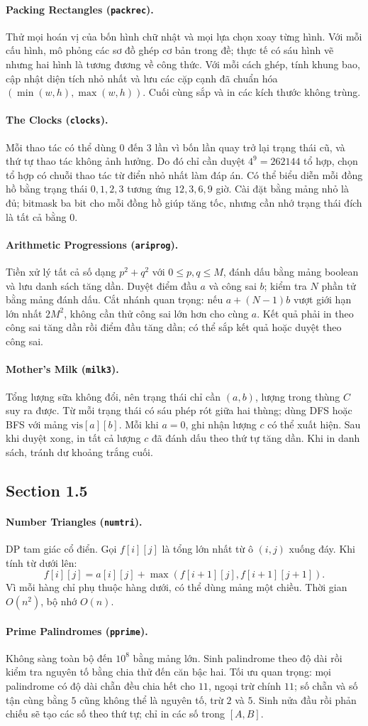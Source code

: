 \documentclass[11pt]{article}
\newcommand{\problem}[2]{\paragraph{#1 (\texttt{#2}).}}
\newcommand{\bigO}[1]{\ensuremath{O(#1)}}
\begin{document}
\problem{Packing Rectangles}{packrec}
Thử mọi hoán vị của bốn hình chữ nhật và mọi lựa chọn xoay từng hình. Với mỗi cấu hình, mô phỏng các sơ đồ ghép cơ bản trong đề; thực tế có sáu hình vẽ nhưng hai hình là tương đương về công thức. Với mỗi cách ghép, tính khung bao, cập nhật diện tích nhỏ nhất và lưu các cặp cạnh đã chuẩn hóa \((\min(w,h),\max(w,h))\). Cuối cùng sắp và in các kích thước không trùng.

\problem{The Clocks}{clocks}
Mỗi thao tác có thể dùng \(0\) đến \(3\) lần vì bốn lần quay trở lại trạng thái cũ, và thứ tự thao tác không ảnh hưởng. Do đó chỉ cần duyệt \(4^9=262144\) tổ hợp, chọn tổ hợp có chuỗi thao tác từ điển nhỏ nhất làm đáp án. Có thể biểu diễn mỗi đồng hồ bằng trạng thái \(0,1,2,3\) tương ứng \(12,3,6,9\) giờ. Cài đặt bằng mảng nhỏ là đủ; bitmask ba bit cho mỗi đồng hồ giúp tăng tốc, nhưng cần nhớ trạng thái đích là tất cả bằng \(0\).

\problem{Arithmetic Progressions}{ariprog}
Tiền xử lý tất cả số dạng \(p^2+q^2\) với \(0\le p,q\le M\), đánh dấu bằng mảng boolean và lưu danh sách tăng dần. Duyệt điểm đầu \(a\) và công sai \(b\); kiểm tra \(N\) phần tử bằng mảng đánh dấu. Cắt nhánh quan trọng: nếu \(a+(N-1)b\) vượt giới hạn lớn nhất \(2M^2\), không cần thử công sai lớn hơn cho cùng \(a\). Kết quả phải in theo công sai tăng dần rồi điểm đầu tăng dần; có thể sắp kết quả hoặc duyệt theo công sai.

\problem{Mother's Milk}{milk3}
Tổng lượng sữa không đổi, nên trạng thái chỉ cần \((a,b)\), lượng trong thùng \(C\) suy ra được. Từ mỗi trạng thái có sáu phép rót giữa hai thùng; dùng DFS hoặc BFS với mảng \(\text{vis}[a][b]\). Mỗi khi \(a=0\), ghi nhận lượng \(c\) có thể xuất hiện. Sau khi duyệt xong, in tất cả lượng \(c\) đã đánh dấu theo thứ tự tăng dần. Khi in danh sách, tránh dư khoảng trắng cuối.

\subsection*{Section 1.5}

\problem{Number Triangles}{numtri}
DP tam giác cổ điển. Gọi \(f[i][j]\) là tổng lớn nhất từ ô \((i,j)\) xuống đáy. Khi tính từ dưới lên:
\[
  f[i][j]=a[i][j]+\max(f[i+1][j],f[i+1][j+1]).
\]
Vì mỗi hàng chỉ phụ thuộc hàng dưới, có thể dùng mảng một chiều. Thời gian \(\bigO{n^2}\), bộ nhớ \(\bigO{n}\).

\problem{Prime Palindromes}{pprime}
Không sàng toàn bộ đến \(10^8\) bằng mảng lớn. Sinh palindrome theo độ dài rồi kiểm tra nguyên tố bằng chia thử đến căn bậc hai. Tối ưu quan trọng: mọi palindrome có độ dài chẵn đều chia hết cho \(11\), ngoại trừ chính \(11\); số chẵn và số tận cùng bằng \(5\) cũng không thể là nguyên tố, trừ \(2\) và \(5\). Sinh nửa đầu rồi phản chiếu sẽ tạo các số theo thứ tự; chỉ in các số trong \([A,B]\).
\end{document}

